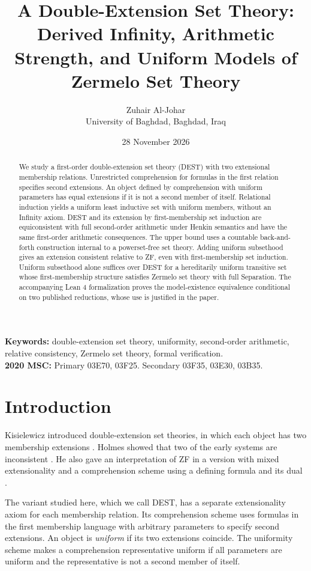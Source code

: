 \documentclass[11pt,a4paper]{article}
\title{A Double-Extension Set Theory: Derived Infinity, Arithmetic Strength, and Uniform Models of Zermelo Set Theory}
\author{Zuhair Al-Johar\\[2pt]\normalsize University of Baghdad, Baghdad, Iraq}
\date{28 November 2026}
\numberwithin{equation}{section}
\theoremstyle{definition}
\theoremstyle{remark}
\begin{document}
\maketitle
\begin{abstract}
We study a first-order double-extension set theory (DEST) with two extensional membership relations. Unrestricted comprehension for formulas in the first relation specifies second extensions. An object defined by comprehension with uniform parameters has equal extensions if it is not a second member of itself. Relational induction yields a uniform least inductive set with uniform members, without an Infinity axiom. DEST and its extension by first-membership set induction are equiconsistent with full second-order arithmetic under Henkin semantics and have the same first-order arithmetic consequences. The upper bound uses a countable back-and-forth construction internal to a powerset-free set theory. Adding uniform subsethood gives an extension consistent relative to ZF, even with first-membership set induction. Uniform subsethood alone suffices over DEST for a hereditarily uniform transitive set whose first-membership structure satisfies Zermelo set theory with full Separation. The accompanying Lean 4 formalization proves the model-existence equivalence conditional on two published reductions, whose use is justified in the paper.
\end{abstract}
\noindent\textbf{Keywords:} double-extension set theory, uniformity, second-order arithmetic, relative consistency, Zermelo set theory, formal verification.\\
\textbf{2020 MSC:} Primary 03E70, 03F25. Secondary 03F35, 03E30, 03B35.

\section{Introduction}
Kisielewicz introduced double-extension set theories, in which each object has two membership extensions \cite{kisielewicz89,kisielewicz98}. Holmes showed that two of the early systems are inconsistent \cite{holmes04}. He also gave an interpretation of ZF in a version with mixed extensionality and a comprehension scheme using a defining formula and its dual \cite[Section 2]{holmes05}.

The variant studied here, which we call DEST, has a separate extensionality axiom for each membership relation. Its comprehension scheme uses formulas in the first membership language with arbitrary parameters to specify second extensions. An object is \emph{uniform} if its two extensions coincide. The uniformity scheme makes a comprehension representative uniform if all parameters are uniform and the representative is not a second member of itself.
\end{document}
